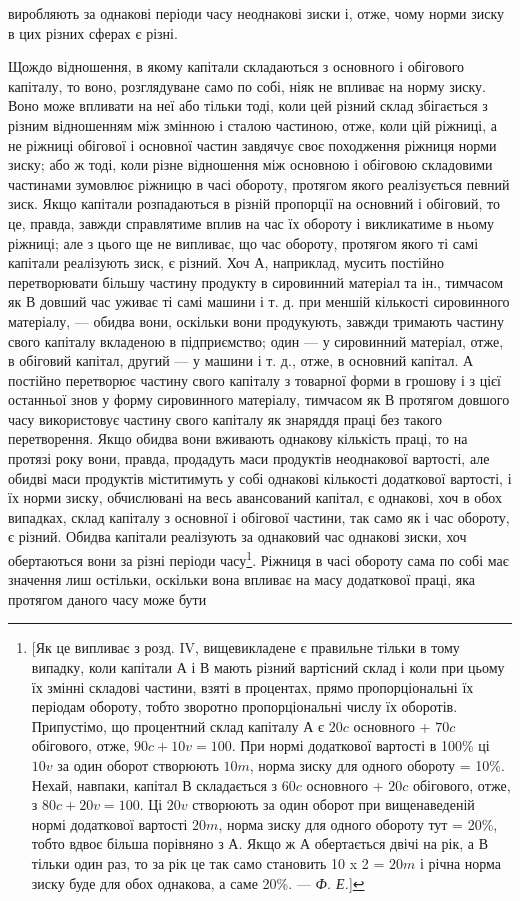 \parcont{}  %
виробляють за однакові періоди часу неоднакові зиски і, отже,
чому норми зиску в цих різних сферах є різні.

Щождо відношення, в якому капітали складаються з основного і обігового капіталу, то воно,
розглядуване само по собі, ніяк не впливає на норму зиску. Воно може впливати на неї або тільки
тоді, коли цей різний склад збігається з різним відношенням між змінною і сталою частиною, отже,
коли цій ріжниці, а не ріжниці обігової і основної частин завдячує своє походження ріжниця норми
зиску; або ж тоді, коли різне відношення між основною і обіговою складовими частинами зумовлює
ріжницю в часі обороту, протягом якого реалізується певний зиск. Якщо капітали розпадаються в різній
пропорції на основний і обіговий, то це, правда, завжди справлятиме вплив
на час їх обороту і викликатиме в ньому ріжниці; але з цього
ще не випливає, що час обороту, протягом якого ті самі капітали реалізують зиск, є різний. Хоч $А$,
наприклад, мусить постійно перетворювати більшу частину продукту в сировинний матеріал та ін.,
тимчасом як $В$ довший час уживає ті самі
машини і т. д. при меншій кількості сировинного матеріалу, — обидва вони, оскільки вони продукують,
завжди тримають
частину свого капіталу вкладеною в підприємство; один — у сировинний матеріал, отже, в обіговий
капітал, другий — у машини
і т. д., отже, в основний капітал. $А$ постійно перетворює частину свого капіталу з товарної форми в
грошову і з цієї останньої знов у форму сировинного матеріалу, тимчасом як $В$ протягом довшого часу
використовує частину свого капіталу як
знаряддя праці без такого перетворення. Якщо обидва вони
вживають однакову кількість праці, то на протязі року вони,
правда, продадуть маси продуктів неоднакової вартості, але
обидві маси продуктів міститимуть у собі однакові кількості
додаткової вартості, і їх норми зиску, обчислювані на весь авансований капітал, є однакові, хоч в
обох випадках, склад капіталу з
основної і обігової частини, так само як і час обороту, є різний.
Обидва капітали реалізують за однаковий час однакові зиски, хоч
обертаються вони за різні періоди часу\footnote{
[Як це випливає з розд. IV, вищевикладене є правильне тільки в тому
випадку, коли капітали $А$ і $В$ мають різний вартісний склад і коли при цьому
їх змінні складові частини, взяті в процентах, прямо пропорціональні їх періодам обороту, тобто
зворотно пропорціональні числу їх оборотів. Припустімо,
що процентний склад капіталу $А$ є $20 c$ основного + $70 c$ обігового, отже,
$90 c + 10 v = 100$. При нормі додаткової вартості в 100\% ці $10 v$ за один оборот створюють $10 m$, норма
зиску для одного обороту = 10\%. Нехай, навпаки, капітал $В$ складається з $60 c$ основного + $20 c$
обігового, отже, з $80 c + 20 v = 100$.
Ці $20 v$ створюють за один оборот при вищенаведеній нормі додаткової вартості $20 m$, норма зиску для
одного обороту тут = 20\%, тобто вдвоє більша
порівняно з $А$. Якщо ж $А$ обертається двічі на рік, а $В$ тільки один раз, то за
рік це так само становить 10 x 2 = $20 m$ і річна норма зиску буде для обох
однакова, а саме 20\%. — \emph{Ф. Е.}]
}. Ріжниця в часі обороту
сама по собі має значення лиш остільки, оскільки вона впливає
на масу додаткової праці, яка протягом даного часу може бути
\parbreak{}  %
